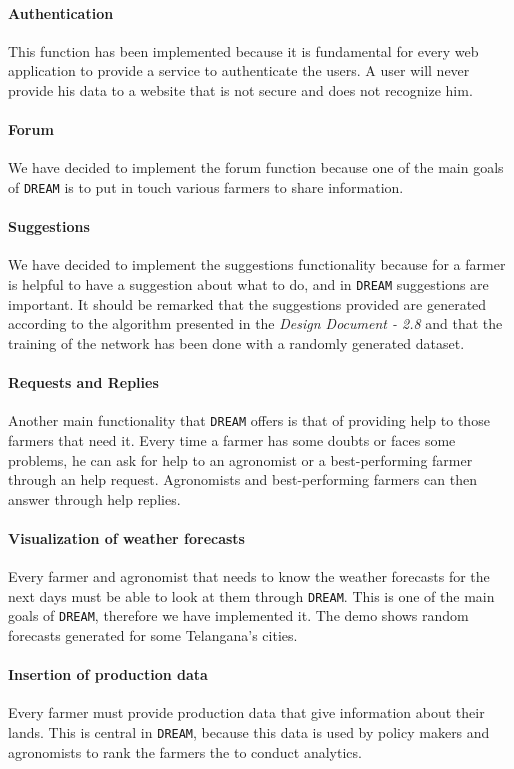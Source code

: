 \documentclass{article}
\begin{document}
\paragraph{Authentication}
This function has been implemented because it is fundamental for every web application to provide a service to authenticate the users. A user will never provide his data to a website that is not secure and does not recognize him.
\paragraph{Forum}
We have decided to implement the forum function because one of the main goals of \verb|DREAM| is to put in touch various farmers to share information.
\paragraph{Suggestions}
We have decided to implement the suggestions functionality because for a farmer is helpful to have a suggestion about what to do, and in \verb|DREAM| suggestions are important. It should be remarked that the suggestions provided are generated according to the algorithm presented in the \textit{Design Document - 2.8} and that the training of the network has been done with a randomly generated dataset.
\paragraph{Requests and Replies}
Another main functionality that \verb|DREAM| offers is that of providing help to those farmers that need it. Every time a farmer has some doubts or faces some problems, he can ask for help to an agronomist or a best-performing farmer through an help request. Agronomists and best-performing farmers can then answer through help replies.
\paragraph{Visualization of weather forecasts}
Every farmer and agronomist that needs to know the weather forecasts for the next days must be able to look at them through \verb|DREAM|. This is one of the main goals of \verb|DREAM|, therefore we have implemented it. The demo shows random forecasts generated for some Telangana's cities.
\paragraph{Insertion of production data}
Every farmer must provide production data that give information about their lands. This is central in \verb|DREAM|, because this data is used by policy makers and agronomists to rank the farmers the to conduct analytics.
\end{document}

